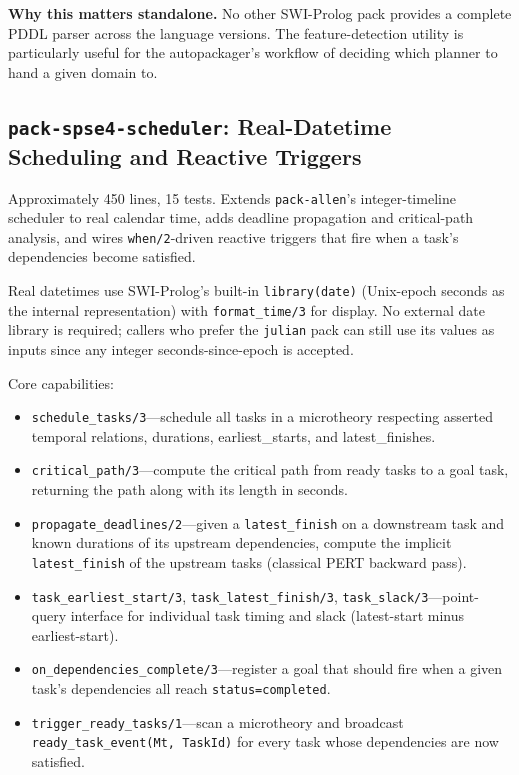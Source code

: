 \documentclass[11pt,letterpaper]{article}
\begin{document}
\textbf{Why this matters standalone.} No other SWI-Prolog pack provides a
complete PDDL parser across the language versions. The feature-detection
utility is particularly useful for the autopackager's workflow of deciding
which planner to hand a given domain to.

\subsection{\texttt{pack-spse4-scheduler}: Real-Datetime Scheduling and Reactive Triggers}
\label{sec:scheduler}

Approximately 450 lines, 15 tests. Extends \texttt{pack-allen}'s
integer-timeline scheduler to real calendar time, adds deadline propagation
and critical-path analysis, and wires \texttt{when/2}-driven reactive
triggers that fire when a task's dependencies become satisfied.

Real datetimes use SWI-Prolog's built-in \texttt{library(date)} (Unix-epoch
seconds as the internal representation) with \texttt{format\_time/3} for
display. No external date library is required; callers who prefer the
\texttt{julian} pack can still use its values as inputs since any integer
seconds-since-epoch is accepted.

Core capabilities:

\begin{itemize}
\item \texttt{schedule\_tasks/3}---schedule all tasks in a microtheory
  respecting asserted temporal relations, durations, earliest\_starts, and
  latest\_finishes.
\item \texttt{critical\_path/3}---compute the critical path from ready
  tasks to a goal task, returning the path along with its length in
  seconds.
\item \texttt{propagate\_deadlines/2}---given a \texttt{latest\_finish} on
  a downstream task and known durations of its upstream dependencies,
  compute the implicit \texttt{latest\_finish} of the upstream tasks
  (classical PERT backward pass).
\item \texttt{task\_earliest\_start/3}, \texttt{task\_latest\_finish/3},
  \texttt{task\_slack/3}---point-query interface for individual task timing
  and slack (latest-start minus earliest-start).
\item \texttt{on\_dependencies\_complete/3}---register a goal that should
  fire when a given task's dependencies all reach \texttt{status=completed}.
\item \texttt{trigger\_ready\_tasks/1}---scan a microtheory and broadcast
  \texttt{ready\_task\_event(Mt, TaskId)} for every task whose dependencies
  are now satisfied.
\end{itemize}
\end{document}
